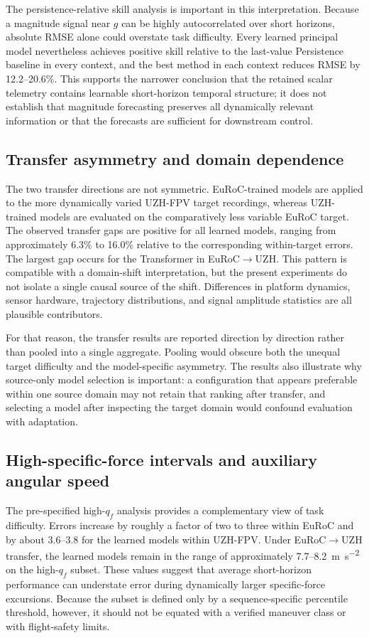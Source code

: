 \documentclass[preprint,12pt]{elsarticle}
\newcommand{\qf}{q_f}
\begin{document}
The persistence-relative skill analysis is important in this interpretation. Because a magnitude signal near $g$ can be highly autocorrelated over short horizons, absolute RMSE alone could overstate task difficulty. Every learned principal model nevertheless achieves positive skill relative to the last-value Persistence baseline in every context, and the best method in each context reduces RMSE by 12.2--20.6\%. This supports the narrower conclusion that the retained scalar telemetry contains learnable short-horizon temporal structure; it does not establish that magnitude forecasting preserves all dynamically relevant information or that the forecasts are sufficient for downstream control.

\subsection{Transfer asymmetry and domain dependence}

The two transfer directions are not symmetric. EuRoC-trained models are applied to the more dynamically varied UZH-FPV target recordings, whereas UZH-trained models are evaluated on the comparatively less variable EuRoC target. The observed transfer gaps are positive for all learned models, ranging from approximately 6.3\% to 16.0\% relative to the corresponding within-target errors. The largest gap occurs for the Transformer in EuRoC$\rightarrow$UZH. This pattern is compatible with a domain-shift interpretation, but the present experiments do not isolate a single causal source of the shift. Differences in platform dynamics, sensor hardware, trajectory distributions, and signal amplitude statistics are all plausible contributors.

For that reason, the transfer results are reported direction by direction rather than pooled into a single aggregate. Pooling would obscure both the unequal target difficulty and the model-specific asymmetry. The results also illustrate why source-only model selection is important: a configuration that appears preferable within one source domain may not retain that ranking after transfer, and selecting a model after inspecting the target domain would confound evaluation with adaptation.

\subsection{High-specific-force intervals and auxiliary angular speed}

The pre-specified high-$\qf$ analysis provides a complementary view of task difficulty. Errors increase by roughly a factor of two to three within EuRoC and by about 3.6--3.8 for the learned models within UZH-FPV. Under EuRoC$\rightarrow$UZH transfer, the learned models remain in the range of approximately 7.7--\SI{8.2}{\metre\per\second\squared} on the high-$\qf$ subset. These values suggest that average short-horizon performance can understate error during dynamically larger specific-force excursions. Because the subset is defined only by a sequence-specific percentile threshold, however, it should not be equated with a verified maneuver class or with flight-safety limits.
\end{document}
